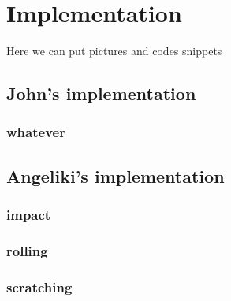 \chapter{Implementation}\label{ch:implementation}
\mbox{}\par
Here we can put pictures and codes snippets


\section{John's implementation}
\mbox{}\par

\subsection{whatever}

\section{Angeliki's implementation}

\subsection{impact}
\subsection{rolling}
\subsection{scratching}